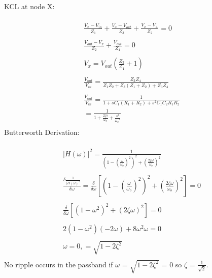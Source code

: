 \documentclass{article}
\begin{document}
KCL at node X:\\
\\
\begin {gather*}
\frac{V_x-V_{in}}{Z_1} + \frac{V_x-V_{out}}{Z_3} + \frac{V_x-V_+}{Z_2} = 0\\
\\
\frac{V_{out}-V_x}{Z_2} + \frac{V_{out}}{Z_4} = 0\\
\\
V_x = V_{out}(\frac{Z_2}{Z_4}+1)\\
\\
\frac{V_{out}}{V_{in}} = \frac{Z_3Z_4}{Z_1Z_2+Z_3(Z_1+Z_2)+Z_3Z_4}\\
\\
\frac{V_{out}}{V_{in}} = \frac{1}{1+sC_1(R_1+R_2)+s^2C_1C_2R_1R_2}\\
= \frac{1}{1+\frac{2\zeta s}{\omega_o}+\frac{s^2}{{\omega_o}^2}}\\
\end {gather*}
Butterworth Derivation:\\
\\
\begin {gather*}
{|H(\omega)|}^2  = \frac{1}{{(1-{(\frac{\omega}{\omega_o})}^2)}^2 +{(\frac{2\zeta\omega}{\omega_o})}^2}\\
\\
\frac{\delta\frac{1}{{|H(\omega)}^2}}{\delta\omega} = \frac{\delta}{\delta\omega}[{(1-{(\frac{\omega}{\omega_o})}^2)}^2 + {(\frac{2\zeta\omega}{\omega_o})}^2] = 0\\
\\
\frac{\delta}{\delta\omega}[{(1-\omega^2)}^2 + {(2\zeta\omega)}^2] = 0\\
\\
2(1-\omega^2)(-2\omega) + 8\omega^2\omega = 0\\
\\
\omega = 0, = \sqrt{1-2\zeta^2}\\
\end {gather*}
No ripple occurs in the passband if $\omega$ = $\sqrt{1-2\zeta^2}$ = 0 so $\zeta$ = $\frac{1}{\sqrt{2}}$.
\end{document}
